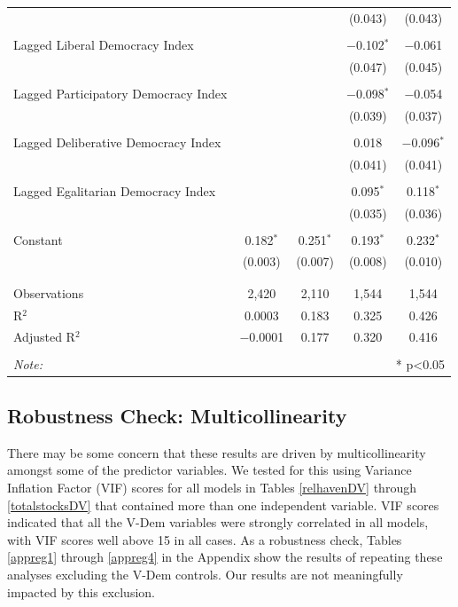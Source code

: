 \documentclass[11pt, titlepage]{article} %
\begin{document}
\begin{table}[!htbp]
\begin{tabular}{@{\extracolsep{5pt}}lcccc}
  &  &  & (0.043) & (0.043) \\ 
  & & & & \\ 
 Lagged Liberal Democracy Index &  &  & $-$0.102$^{*}$ & $-$0.061 \\ 
  &  &  & (0.047) & (0.045) \\ 
  & & & & \\ 
 Lagged Participatory Democracy Index &  &  & $-$0.098$^{*}$ & $-$0.054 \\ 
  &  &  & (0.039) & (0.037) \\ 
  & & & & \\ 
 Lagged Deliberative Democracy Index &  &  & 0.018 & $-$0.096$^{*}$ \\ 
  &  &  & (0.041) & (0.041) \\ 
  & & & & \\ 
 Lagged Egalitarian Democracy Index &  &  & 0.095$^{*}$ & 0.118$^{*}$ \\ 
  &  &  & (0.035) & (0.036) \\ 
  & & & & \\ 
 Constant & 0.182$^{*}$ & 0.251$^{*}$ & 0.193$^{*}$ & 0.232$^{*}$ \\ 
  & (0.003) & (0.007) & (0.008) & (0.010) \\ 
  & & & & \\ 
\hline \\[-1.8ex] 
Observations & 2,420 & 2,110 & 1,544 & 1,544 \\ 
R$^{2}$ & 0.0003 & 0.183 & 0.325 & 0.426 \\ 
Adjusted R$^{2}$ & $-$0.0001 & 0.177 & 0.320 & 0.416 \\ 
\hline 
\hline \\[-1.8ex] 
\textit{Note:}  & \multicolumn{4}{r}{* p<0.05} \\ 
\end{tabular} 
\end{table}

\subsection*{Robustness Check: Multicollinearity}

There may be some concern that these results are driven by multicollinearity amongst some of the predictor variables. We tested for this using Variance Inflation Factor (VIF) scores for all models in Tables \ref{relhavenDV} through \ref{totalstocksDV} that contained more than one independent variable. VIF scores indicated that all the V-Dem variables were strongly correlated in all models, with VIF scores well above 15 in all cases. As a robustness check, Tables \ref{appreg1} through \ref{appreg4} in the Appendix show the results of repeating these analyses excluding the V-Dem controls. Our results are not meaningfully impacted by this exclusion.
\end{document}
